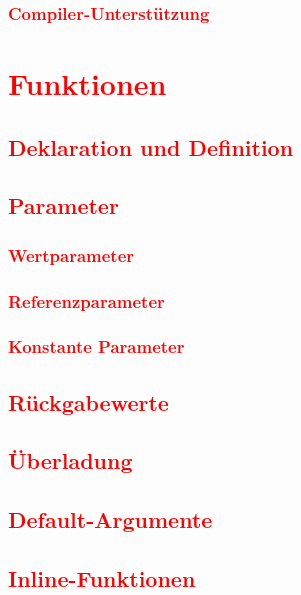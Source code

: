 \subsection{\textcolor{red}{Compiler-Unterstützung}}\label{sec:compiler-support}

\chapter{\textcolor{red}{Funktionen}}\label{chap:functions}
\section{\textcolor{red}{Deklaration und Definition}}\label{sec:function-declaration-definition}
\section{\textcolor{red}{Parameter}}\label{sec:function-parameters}
\subsection{\textcolor{red}{Wertparameter}}\label{sec:value-parameters}
\subsection{\textcolor{red}{Referenzparameter}}\label{sec:reference-parameters}
\subsection{\textcolor{red}{Konstante Parameter}}\label{sec:const-parameters}
\section{\textcolor{red}{Rückgabewerte}}\label{sec:return-values}
\section{\textcolor{red}{Überladung}}\label{sec:function-overloading}
\section{\textcolor{red}{Default-Argumente}}\label{sec:default-arguments}
\section{\textcolor{red}{Inline-Funktionen}}\label{sec:inline-functions}
